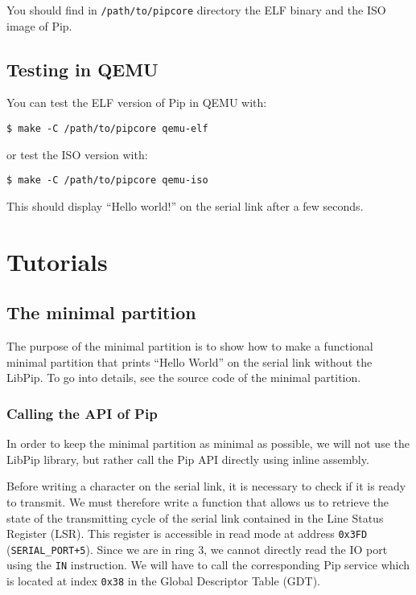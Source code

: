 \documentclass[10pt,a4paper,titlepage]{refart}
\begin{document}
You should find in \texttt{/path/to/pipcore} directory the ELF binary and the
ISO image of Pip.

\subsection{Testing in QEMU}

You can test the ELF version of Pip in QEMU with:

\begin{lstlisting}[style=BashStyle]
    $ make -C /path/to/pipcore qemu-elf
\end{lstlisting}

or test the ISO version with:

\begin{lstlisting}[style=BashStyle]
    $ make -C /path/to/pipcore qemu-iso
\end{lstlisting}

This should display ``Hello world!'' on the serial link after a few seconds.

\section{Tutorials}

\subsection{The minimal partition}

The purpose of the minimal partition is to show how to make a functional minimal
partition that prints ``Hello World'' on the serial link without the LibPip. To
go into details, see the source code of the minimal partition.

\subsubsection{Calling the API of Pip}

In order to keep the minimal partition as minimal as possible, we will not use
the LibPip library, but rather call the Pip API directly using inline assembly.

Before writing a character on the serial link, it is necessary to check if it is
ready to transmit. We must therefore write a function that allows us to retrieve
the state of the transmitting cycle of the serial link contained in the Line
Status Register (LSR). This register is accessible in read mode at address
\texttt{0x3FD} (\texttt{SERIAL\_PORT+5}). Since we are in ring 3, we cannot
directly read the IO port using the \texttt{IN} instruction. We will have to
call the corresponding Pip service which is located at index \texttt{0x38} in
the Global Descriptor Table (GDT).
\end{document}
